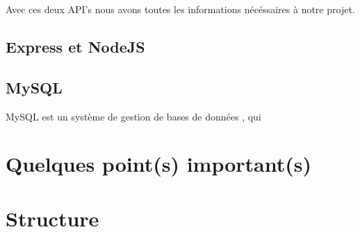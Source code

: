\documentclass[a4paper, 12pt, french]{article}
\begin{document}
			Avec ces deux API's nous avons toutes les informations nécéssaires à notre projet.

			
		\subsection{Express et NodeJS}

		\subsection{MySQL}
			MySQL est un système de gestion de bases de données \cite*{MySQL-wikipedia},
			qui %

	\section{Quelques point(s) important(s)}


	\section{Structure}


	\printbibliography
\end{document}
